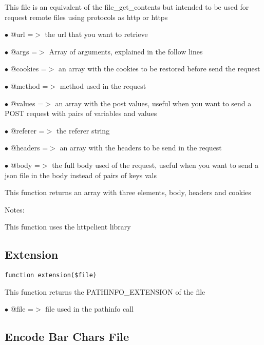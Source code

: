 \documentclass[a4paper]{book}
\begin{document}
This file is an equivalent of the file\_get\_contents but intended to be used
for request remote files using protocols as http or https

\begin{compactitem}
\item[\color{myblue}$\bullet$] @url     =$>$ the url that you want to retrieve
\item[\color{myblue}$\bullet$] @args    =$>$ Array of arguments, explained in the follow lines
\item[\color{myblue}$\bullet$] @cookies =$>$ an array with the cookies to be restored before send the request
\item[\color{myblue}$\bullet$] @method  =$>$ method used in the request
\item[\color{myblue}$\bullet$] @values  =$>$ an array with the post values, useful when you want to send a POST
            request with pairs of variables and values
\item[\color{myblue}$\bullet$] @referer =$>$ the referer string
\item[\color{myblue}$\bullet$] @headers =$>$ an array with the headers to be send in the request
\item[\color{myblue}$\bullet$] @body    =$>$ the full body used of the request, useful when you want to send a
            json file in the body instead of pairs of keys vals
\end{compactitem}

This function returns an array with three elements, body, headers and cookies

Notes:

This function uses the httpclient library

\hypertarget{toc132}{}
\subsection{Extension}

\begin{lstlisting}
function extension($file)
\end{lstlisting}

This function returns the PATHINFO\_EXTENSION of the file

\begin{compactitem}
\item[\color{myblue}$\bullet$] @file =$>$ file used in the pathinfo call
\end{compactitem}

\hypertarget{toc133}{}
\subsection{Encode Bar Chars File}
\end{document}
